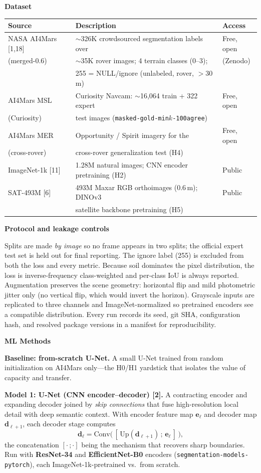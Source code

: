 \documentclass[11pt]{article}
\newcommand{\hdr}[1]{\medskip\noindent\textbf{#1}\par\nopagebreak}
\begin{document}
\hdr{Dataset}
\begin{center}
\begin{tabular}{@{}lll@{}}
\toprule
Source & Description & Access \\
\midrule
NASA AI4Mars [1,18] & $\sim$326K crowdsourced segmentation labels over & Free, open \\
(merged-0.6) & $\sim$35K rover images; 4 terrain classes (0--3); & (Zenodo) \\
 & 255 = NULL/ignore (unlabeled, rover, $>$30\,m) & \\
AI4Mars MSL & Curiosity Navcam: $\sim$16{,}064 train + 322 expert & Free, open \\
(Curiosity) & test images (\texttt{masked-gold-min$k$-100agree}) & \\
AI4Mars MER & Opportunity / Spirit imagery for the & Free, open \\
(cross-rover) & cross-rover generalization test (H4) & \\
ImageNet-1k [11] & 1.28M natural images; CNN encoder pretraining (H2) & Public \\
SAT-493M [6] & 493M Maxar RGB orthoimages (0.6\,m); DINOv3 & Public \\
 & satellite backbone pretraining (H5) & \\
\bottomrule
\end{tabular}
\end{center}

\hdr{Protocol and leakage controls}
Splits are made \emph{by image} so no frame appears in two splits; the official expert test set is
held out for final reporting. The ignore label (255) is excluded from both the loss and every metric.
Because soil dominates the pixel distribution, the loss is inverse-frequency class-weighted and
per-class IoU is always reported. Augmentation preserves the scene geometry: horizontal flip and mild
photometric jitter only (no vertical flip, which would invert the horizon). Grayscale inputs are
replicated to three channels and ImageNet-normalized so pretrained encoders see a compatible
distribution. Every run records its seed, git SHA, configuration hash, and resolved package versions
in a manifest for reproducibility.

\hdr{ML Methods}

\noindent\textbf{Baseline: from-scratch U-Net.} A small U-Net trained from random initialization on
AI4Mars only---the H0/H1 yardstick that isolates the value of capacity and transfer.

\smallskip\noindent\textbf{Model 1: U-Net (CNN encoder--decoder) [2].} A contracting encoder and
expanding decoder joined by \emph{skip connections} that fuse high-resolution local detail with
deep semantic context. With encoder feature map $\mathbf{e}_\ell$ and decoder map
$\mathbf{d}_{\ell+1}$, each decoder stage computes
\[
\mathbf{d}_\ell = \mathrm{Conv}\big(\,[\,\mathrm{Up}(\mathbf{d}_{\ell+1})\,;\,\mathbf{e}_\ell\,]\,\big),
\]
the concatenation $[\cdot\,;\cdot]$ being the mechanism that recovers sharp boundaries. Run with
\textbf{ResNet-34} and \textbf{EfficientNet-B0} encoders (\texttt{segmentation-models-pytorch}), each
ImageNet-1k-pretrained vs.\ from scratch.
\end{document}
